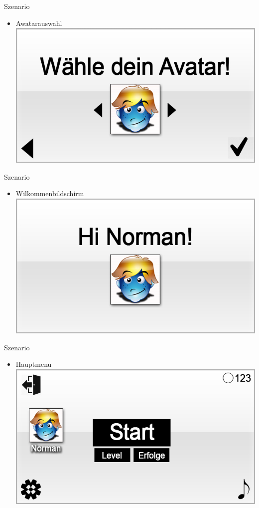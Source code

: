 \documentclass[18pt]{beamer}
\begin{document}
\begin{frame}{Szenario}
\begin{itemize}
\item Awatarauswahl
\includegraphics[scale=0.5]{../gui/_jpeg/registration3}
\end{itemize}
\end{frame}

\begin{frame}{Szenario}
\begin{itemize}
\item Wilkommenbildschirm
\includegraphics[scale=0.5]{../gui/_jpeg/welcome}
\end{itemize}
\end{frame}

\begin{frame}{Szenario}
\begin{itemize}
\item Hauptmenu
\includegraphics[scale=0.5]{../gui/_jpeg/main_manu}
\end{itemize}
\end{frame}
\end{document}
